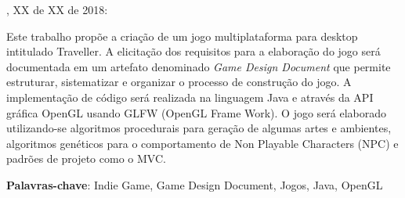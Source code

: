 \documentclass[12pt, 
openright, 
oneside, 
a4paper,    
brazil]{facom-ufu-abntex2}
\begin{document}

\imprimircapa
\begin{folhadeaprovacao}

  \begin{center}
    {\ABNTEXchapterfont\large\imprimirautor}

    \vspace*{\fill}\vspace*{\fill}
    {\ABNTEXchapterfont\bfseries\Large\imprimirtitulo}
    \vspace*{\fill}
    
    \hspace{.45\textwidth}
    \begin{minipage}{.5\textwidth}
    \imprimirpreambulo
    \end{minipage}%
    \vspace*{\fill}
   \end{center}
    
   \imprimirlocal, XX de XX de 2018: %

      
   \begin{center}
    \vspace*{0.5cm}
    {\large\imprimirlocal}
    \par
    {\large\imprimirdata}
    \vspace*{1cm}
  \end{center}
  
\end{folhadeaprovacao}

\begin{resumo} 

Este trabalho propõe a criação de um jogo multiplataforma  para desktop intitulado Traveller.
A elicitação dos requisitos para a elaboração do jogo será documentada em um artefato denominado \textit{Game Design Document} que permite estruturar, sistematizar e organizar 
o processo de construção do jogo.
A implementação de código será realizada na linguagem Java e através da API gráfica OpenGL usando GLFW (OpenGL Frame Work). 
O jogo será elaborado utilizando-se algoritmos procedurais para geração de algumas artes e ambientes, algoritmos genéticos para o comportamento de Non Playable Characters (NPC) e padrões de projeto como o MVC.
 
 \vspace{\onelineskip}
 \noindent
 \textbf{Palavras-chave}: Indie Game, Game Design Document, Jogos, Java, OpenGL
\end{resumo}
\end{document}
